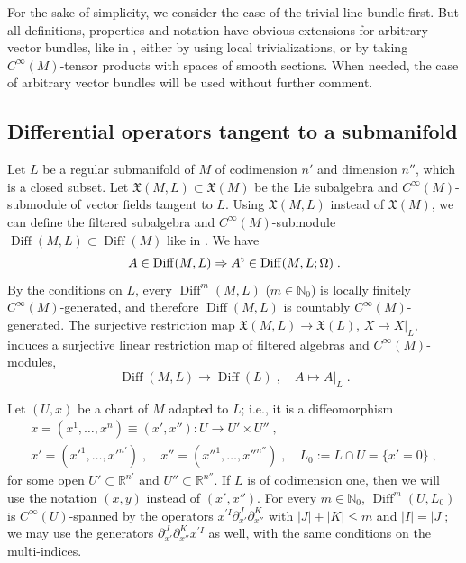 \documentclass{memo-l}
\theoremstyle{plain}
\theoremstyle{definition}
\theoremstyle{remark}
\newcommand{\N}{\mathbb{N}}
\newcommand{\R}{\mathbb{R}}
\newcommand{\fX}{\mathfrak{X}}
\newcommand{\Diff}{\operatorname{Diff}}
\newcommand{\trans}{{\text{\rm t}}}
\numberwithin{section}{chapter}
\numberwithin{equation}{section}%
\begin{document}
For the sake of simplicity, we consider the case of the trivial line bundle first. But all definitions, properties and notation have obvious extensions for arbitrary vector bundles, like in , either by using local trivializations, or by taking $C^\infty(M)$-tensor products with spaces of smooth sections. When needed, the case of arbitrary vector bundles will be used without further comment.


\subsection{Differential operators tangent to a submanifold}\label{ss: Diff(M L)}

Let $L$ be a regular submanifold of $M$ of codimension $n'$ and dimension $n''$, which is a closed subset. Let $\fX(M,L)\subset\fX(M)$ \index{$\fX(M,L)$} be the Lie subalgebra and $C^\infty(M)$-submodule of vector fields tangent to $L$. Using $\fX(M,L)$ instead of $\fX(M)$, we can define the filtered subalgebra and $C^\infty(M)$-submodule $\Diff(M,L)\subset\Diff(M)$ \index{$\Diff(M,L)$} like in . We have
\begin{equation}\label{A in Diff(M L) => A^t in Diff(M L Omega)}
A\in\Diff(M,L)\Rightarrow A^\trans\in\Diff(M,L;\Omega)\;.
\end{equation}
By the conditions on $L$, every $\Diff^m(M,L)$ ($m\in\N_0$) is locally finitely $C^\infty(M)$-generated, and therefore $\Diff(M,L)$ is countably $C^\infty(M)$-generated. The surjective restriction map $\fX(M,L)\to\fX(L)$, $X\mapsto X|_L$, induces a surjective linear restriction map of filtered algebras and $C^\infty(M)$-modules,
\begin{equation}\label{Diff(M L) -> Diff(L)}
\Diff(M,L)\to\Diff(L)\;,\quad A\mapsto A|_L\;.
\end{equation}


Let $(U,x)$ be a chart of $M$ adapted to $L$; i.e., it is a diffeomorphism
\begin{gather*}
x=(x^1,\dots,x^n)\equiv(x',x''):U\to U'\times U''\;,\\
x'=(x'^1,\dots,x'^{n'})\;,\quad x''=(x''^{1},\dots,x''^{n''})\;,\quad L_0:=L\cap U=\{x'=0\}\;,
\end{gather*}
for some open $U'\subset\R^{n'}$ and $U''\subset\R^{n''}$. If $L$ is of codimension one, then we will use the notation $(x,y)$ instead of $(x',x'')$. For every $m\in\N_0$, $\Diff^m(U,L_0)$ is $C^\infty(U)$-spanned by the operators $x^{\prime I}\partial_{x'}^J\partial_{x''}^K$ with $|J|+|K|\le m$ and $|I|=|J|$; we may use the generators $\partial_{x'}^J\partial_{x''}^K x^{\prime I}$ as well, with the same conditions on the multi-indices. 
\end{document}
